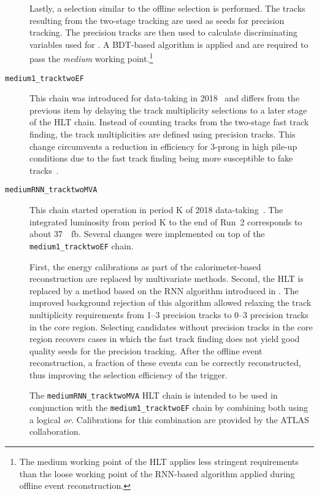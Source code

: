 \begin{description}
  Lastly, a \tauhadvis selection similar to the offline \tauhadvis selection is
  performed. The tracks resulting from the two-stage tracking are used as seeds
  for precision tracking. The precision tracks are then used to calculate
  discriminating variables used for \tauid. A BDT-based \tauid algorithm
  is applied and \tauhadvis are required to pass the \emph{medium} working
  point.\footnote{The medium working point of the HLT \tauid applies less
    stringent requirements than the loose working point of the RNN-based \tauid
    algorithm applied during offline event reconstruction.}

\item[\texttt{medium1\_tracktwoEF}]
  This chain was introduced for data-taking in 2018~\cite{ATL-DAQ-PUB-2019-001}
  and differs from the previous item by delaying the track multiplicity
  selections to a later stage of the HLT chain. Instead of counting tracks from
  the two-stage fast track finding, the track multiplicities are defined using
  precision tracks. This change circumvents a reduction in efficiency for
  3-prong \tauhadvis in high pile-up conditions due to the fast track finding
  being more susceptible to fake tracks~\cite{ATL-DAQ-PUB-2019-001}.

\item[\texttt{mediumRNN\_tracktwoMVA}] This chain started operation in period K
  of 2018 data-taking~\cite{ATL-DAQ-PUB-2019-001}. The integrated luminosity
  from period K to the end of Run~2 corresponds to about
  \SI{37}{\per\femto\barn}. Several changes were implemented on top of the
  \texttt{medium1\_tracktwoEF} chain.

  First, the \tauhadvis energy calibrations as part of the calorimeter-based
  \tauhadvis reconstruction are replaced by multivariate methods. Second, the
  HLT \tauid is replaced by a method based on the RNN \tauid algorithm
  introduced in . The improved background rejection of this
  algorithm allowed relaxing the track multiplicity requirements from 1--3
  precision tracks to 0--3 precision tracks in the core region. Selecting
  \tauhadvis candidates without precision tracks in the core region recovers
  cases in which the fast track finding does not yield good quality seeds for
  the precision tracking. After the offline event reconstruction, a fraction of
  these events can be correctly reconstructed, thus improving the selection
  efficiency of the trigger.

  The \texttt{mediumRNN\_tracktwoMVA} HLT chain is intended to be used in
  conjunction with the \texttt{medium1\_tracktwoEF} chain by combining both
  using a logical \emph{or}. Calibrations for this combination are provided by
  the ATLAS collaboration.
\end{description}

